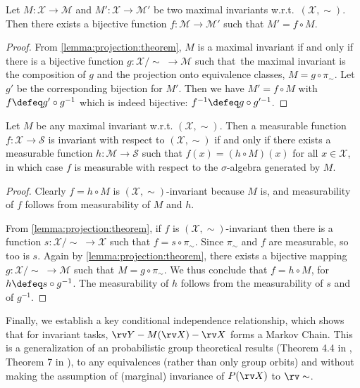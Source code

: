 \documentclass[final]{article}
\begin{document}
\begin{lemma}\label{lemma:maxinv_bijection}
Let $M \colon \mathcal{X} \to \mathcal{M}$ and $M' \colon \mathcal{X} \to \mathcal{M'}$ be two maximal invariants w.r.t.\ $(\mathcal{X}, \sim)$. Then there exists a bijective function $f \colon \mathcal{M} \to \mathcal{M}'$ such that $ M' =  f \circ M$.
\end{lemma}
\begin{proof}
From \cref{lemma:projection:theorem}, $M$ is a maximal invariant if and only if there is a bijective function $g \colon \mathcal{X}/\sim  \; \to \mathcal{M}$ such that\ the maximal invariant is the composition of $g$ and the projection onto equivalence classes, \ie $M = g \circ \pi_{\sim}$.
Let $g'$ be the corresponding bijection for $M'$.
Then we have $M' = f \circ  M$ with $f \defeq g'  \circ  g^{-1}$ which is indeed bijective: $f^{-1} \defeq g  \circ  g'^{-1}$.
\end{proof}

\begin{lemma}\label{lemma:maxinv_invariance}
Let $M$ be any maximal invariant w.r.t. $(\mathcal{X}, \sim)$.
Then a measurable function $f \colon \mathcal{X} \to \mathcal{S}$ is invariant with respect to $(\mathcal{X}, \sim)$ if and only if there exists a measurable function $h \colon \mathcal{M} \to \mathcal{S}$ such that $f(x) = (h \circ M)(x)$ for all $x \in \mathcal{X}$, in which case $f$ is measurable with respect to the $\sigma$-algebra generated by $M$.
\end{lemma}
\begin{proof}
Clearly $f = h \circ M $ is $(\mathcal{X}, \sim)$-invariant because $M$ is, and measurability of $f$ follows from measurability of $M$ and $h$.

From \cref{lemma:projection:theorem}, if $f$ is $(\mathcal{X}, \sim)$-invariant then there is a function $s : \mathcal{X}/\sim  \; \to \mathcal{X}$ such that $f = s \circ \pi_{\sim}$. Since $\pi_{\sim}$ and $f$ are measurable, so too is $s$. 
Again by \cref{lemma:projection:theorem}, there exists a bijective mapping $g \colon \mathcal{X}/\sim  \; \to \mathcal{M}$ such that $M = g \circ \pi_{\sim}$.
We thus conclude that $f = h \circ M$, for $h \defeq s \circ g^{-1}$.
The measurability of $h$ follows from the measurability of $s$ and of $g^{-1}$. 
\end{proof}

Finally, we establish a key conditional independence relationship, which shows that for invariant tasks,  $\rv Y - M(\rv X) -\rv X$ forms a Markov Chain. 
This is a generalization of an probabilistic group theoretical results (Theorem 4.4 in \citet{eaton_group_1989}, Theorem 7 in \citet{bloem-reddy_probabilistic_2020}), to any equivalences (rather than only group orbits) and without making the assumption of (marginal) invariance of $P(\rv X)$ to $\rv \sim$.
\end{document}
